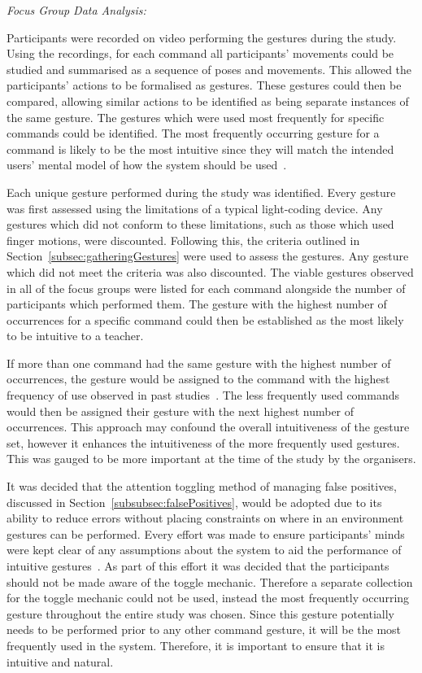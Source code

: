 \documentclass[link]{IWCOMP}
\begin{document}
\emph{Focus Group Data Analysis:}

Participants were recorded on video performing the gestures during the study.
Using the recordings, for each command all participants' movements could be studied and summarised as a sequence of poses and movements.
This allowed the participants' actions to be formalised as gestures.
These gestures could then be compared, allowing similar actions to be identified as being separate instances of the same gesture.
The gestures which were used most frequently for specific commands could be identified.
The most frequently occurring gesture for a command is likely to be the most intuitive since they will match the intended users' mental model of how the system should be used~\cite{Nielsen2004,Ruiz2011,Wobbrock2009}.

Each unique gesture performed during the study was identified.
Every gesture was first assessed using the limitations of a typical light-coding device.
Any gestures which did not conform to these limitations, such as those which used finger motions, were discounted.
Following this, the criteria outlined in Section~\ref{subsec:gatheringGestures} were used to assess the gestures.
Any gesture which did not meet the criteria was also discounted.
The viable gestures observed in all of the focus groups were listed for each command alongside the number of participants which performed them.
The gesture with the highest number of occurrences for a specific command could then be established as the most likely to be intuitive to a teacher.

If more than one command had the same gesture with the highest number of occurrences, the gesture would be assigned to the command with the highest frequency of use observed in past studies~\cite{HatchA.HigginsS&Mercier2009}.
The less frequently used commands would then be assigned their gesture with the next highest number of occurrences.
This approach may confound the overall intuitiveness of the gesture set, however it enhances the intuitiveness of the more frequently used gestures.
This was gauged to be more important at the time of the study by the organisers.

It was decided that the attention toggling method of managing false positives, discussed in Section~\ref{subsubsec:falsePositives}, would be adopted due to its ability to reduce errors without placing constraints on where in an environment gestures can be performed.
Every effort was made to ensure participants' minds were kept clear of any assumptions about the system to aid the performance of intuitive gestures~\cite{Nielsen2004}.
As part of this effort it was decided that the participants should not be made aware of the toggle mechanic.
Therefore a separate collection for the toggle mechanic could not be used, instead the most frequently occurring gesture throughout the entire study was chosen.
Since this gesture potentially needs to be performed prior to any other command gesture, it will be the most frequently used in the system.
Therefore, it is important to ensure that it is intuitive and natural.
\end{document}

